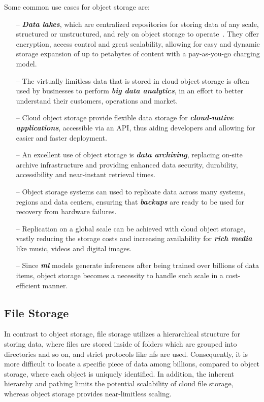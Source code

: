 Some common use cases for object storage are:
\begin{itemize}
    \item[--] \textit{\textbf{Data lakes}}, which are centralized repositories for storing data of any scale, structured or unstructured, and rely on object storage to operate~\cite{datalake}. They offer encryption, access control and great scalability, allowing for easy and dynamic storage expansion of up to petabytes of content with a pay-as-you-go charging model.

    \item[--] The virtually limitless data that is stored in cloud object storage is often used by businesses to perform \textit{\textbf{big data analytics}}, in an effort to better understand their customers, operations and market.

    \item [--] Cloud object storage provide flexible data storage for \textit{\textbf{cloud-native applications}}, accessible via an API, thus aiding developers and allowing for easier and faster deployment.

    \item[--] An excellent use of object storage is \textbf{\textit{data archiving}}, replacing on-site archive infrastructure and providing enhanced data security, durability, accessibility and near-instant retrieval times.

    \item [--] Object storage systems can used to replicate data across many systems, regions and data centers, ensuring that \textbf{\textit{backups}} are ready to be used for recovery from hardware failures.

    \item [--] Replication on a global scale can be achieved with cloud object storage, vastly reducing the storage costs and increasing availability for \textit{\textbf{rich media}} like music, videos and digital images.

    \item [--]  Since \textit{\textbf{\ac{ml}}} models generate inferences after being trained over billions of data items, object storage becomes a necessity to handle such scale in a cost-efficient manner.
\end{itemize}

\subsection{File Storage}
In contrast to object storage, file storage utilizes a hierarchical structure for storing data, where files are stored inside of folders which are grouped into directories and so on, and strict protocols like \ac{nfs} are used. Consequently, it is more difficult to locate a specific piece of data among billions, compared to object storage, where each object is uniquely identified. In addition, the inherent hierarchy and pathing limits the potential scalability of cloud file storage, whereas object storage provides near-limitless scaling.

